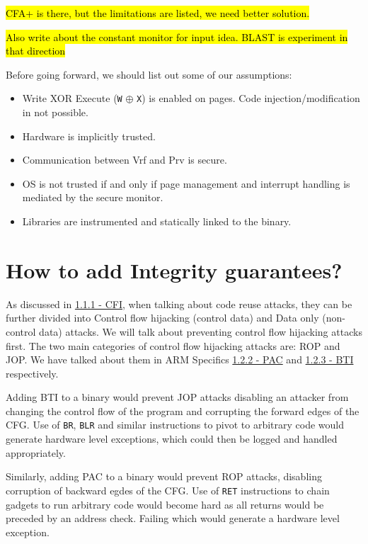 \documentclass[a4paper, nobind]{templates/ociamthesis}
\providecommand{\tightlist}{%
  \setlength{\itemsep}{0pt}\setlength{\parskip}{0pt}}
\begin{document}
\hl{CFA+ is there, but the limitations are listed, we need better solution.}

\hl{Also write about the constant monitor for input idea. BLAST is experiment in that direction}

Before going forward, we should list out some of our assumptions:

\begin{itemize}
\tightlist
\item
  Write XOR Execute (\texttt{W} \(\oplus\) \texttt{X}) is enabled on pages. Code injection/modification in not possible.
\item
  Hardware is implicitly trusted.
\item
  Communication between Vrf and Prv is secure.
\item
  OS is not trusted if and only if page management and interrupt handling is mediated
  by the secure monitor.
\item
  Libraries are instrumented and statically linked to the binary.
\end{itemize}

\section{How to add Integrity guarantees?}\label{adding-integrity}

As discussed in \hyperref[cfi]{1.1.1 - CFI}, when talking about code reuse attacks, they can be further divided into
Control flow hijacking (control data) and Data only (non-control data) attacks.
We will talk about preventing control flow hijacking attacks first.
The two main categories of control flow hijacking attacks are: ROP and JOP.
We have talked about them in ARM Specifics \hyperref[pac-bg]{1.2.2 - PAC} and \hyperref[bti-bg]{1.2.3 - BTI} respectively.

Adding BTI to a binary would prevent JOP attacks disabling an attacker from changing
the control flow of the program and corrupting the forward edges of the CFG.
Use of \texttt{BR}, \texttt{BLR} and similar instructions to pivot to arbitrary code would generate hardware
level exceptions, which could then be logged and handled appropriately.

Similarly, adding PAC to a binary would prevent ROP attacks, disabling corruption
of backward egdes of the CFG.
Use of \texttt{RET} instructions to chain gadgets to run arbitrary code would become hard
as all returns would be preceded by an address check. Failing which would generate
a hardware level exception.
\end{document}
